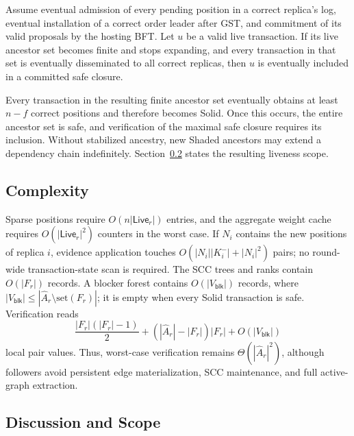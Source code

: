 \begin{proposition}
\label{prop:stabilized-progress}
Assume eventual admission of every pending position in a correct replica's
log, eventual installation of a correct order leader after GST, and commitment
of its valid proposals by the hosting BFT.  Let $u$ be a valid live
transaction.  If its live ancestor set becomes finite and stops expanding,
and every transaction in that set is eventually disseminated to all correct
replicas, then $u$ is eventually included in a committed safe closure.
\end{proposition}

Every transaction in the resulting finite ancestor set eventually obtains at
least $n-f$ correct positions and therefore becomes Solid.  Once this occurs,
the entire ancestor set is safe, and verification of the maximal safe closure
requires its inclusion.  Without stabilized ancestry, new Shaded ancestors
may extend a dependency chain indefinitely.  Section~\ref{sec:discussion-scope}
states the resulting liveness scope.

\subsection{Complexity}
\label{sec:complexity}

Sparse positions require $O(n|\mathsf{Live}_r|)$ entries, and the aggregate
weight cache requires $O(|\mathsf{Live}_r|^2)$ counters in the worst case.  If
$N_i$ contains the new positions of replica $i$, evidence application touches
$O(|N_i||K_i^-|+|N_i|^2)$ pairs; no round-wide transaction-state scan is
required.  The SCC trees and ranks contain $O(|F_r|)$ records.  A blocker
forest contains $O(|V_{\mathsf{blk}}|)$ records, where
$|V_{\mathsf{blk}}|\le|\widehat A_r\setminus\mathrm{set}(F_r)|$; it is empty when every Solid
transaction is safe.  Verification reads
\[
 \frac{|F_r|(|F_r|-1)}{2}
 +( |\widehat A_r|-|F_r| )|F_r|+O(|V_{\mathsf{blk}}|)
\]
local pair values.  Thus, worst-case verification remains
$\Theta(|\widehat A_r|^2)$, although followers avoid persistent edge materialization,
SCC maintenance, and full active-graph extraction.

\subsection{Discussion and Scope}
\label{sec:discussion-scope}

